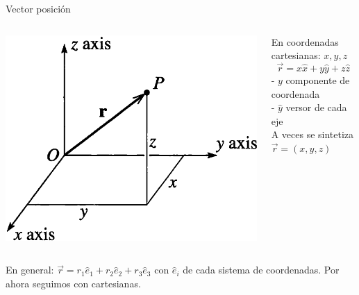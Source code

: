 \documentclass[serif]{beamer}
\begin{document}
\begin{frame}
\begin{block}{Vector posición}
    \begin{columns}[c]
        \begin{column}{0.65\textwidth}
            \includegraphics[width=\textwidth]{taylor1_1}
        \end{column}
        \begin{column}{0.35\textwidth}
            En coordenadas cartesianas: \(x,y,z\)
            \[
                \vec{r}= x \hat{x}+ y \hat{y}+ z \hat{z}
            \]
            \pause
            - \(y\) componente de coordenada\\
            - \(\hat{y}\) versor de cada eje\\
            \bigskip
            \pause
            A veces se sintetiza
            \(\vec{r}= (x,y,z)\)
        \end{column}
    \end{columns}
\end{block}
\pause
\begin{block}{}
    En general: \(\vec{r}= r_1 \hat{e}_1 +  r_2 \hat{e}_2 + r_3 \hat{e}_3\) con \(\hat{e}_i\) de cada sistema de coordenadas.
    Por ahora seguimos con cartesianas.
\end{block}
\end{frame}
\end{document}
